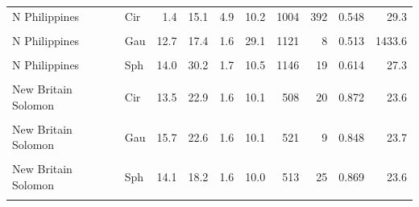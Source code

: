 \begin{ThreePartTable}
\begin{longtable}[t]{llrrrrrrrr}
N Philippines & Cir & 1.4 & 15.1 & 4.9 & 10.2 & 1004 & 392 & 0.548 & 29.3\\
\cellcolor{gray!6}{N Philippines} & \cellcolor{gray!6}{Exp} & \cellcolor{gray!6}{13.2} & \cellcolor{gray!6}{27.6} & \cellcolor{gray!6}{1.6} & \cellcolor{gray!6}{10.0} & \cellcolor{gray!6}{1265} & \cellcolor{gray!6}{11} & \cellcolor{gray!6}{0.615} & \cellcolor{gray!6}{27.3}\\
N Philippines & Gau & 12.7 & 17.4 & 1.6 & 29.1 & 1121 & 8 & 0.513 & 1433.6\\
\cellcolor{gray!6}{N Philippines} & \cellcolor{gray!6}{Lin} & \cellcolor{gray!6}{1.3} & \cellcolor{gray!6}{15.4} & \cellcolor{gray!6}{1.6} & \cellcolor{gray!6}{14.2} & \cellcolor{gray!6}{1206} & \cellcolor{gray!6}{66} & \cellcolor{gray!6}{0.541} & \cellcolor{gray!6}{28.6}\\
N Philippines & Sph & 14.0 & 30.2 & 1.7 & 10.5 & 1146 & 19 & 0.614 & 27.3\\
\cellcolor{gray!6}{New Britain Solomon} & \cellcolor{gray!6}{Bes} & \cellcolor{gray!6}{15.3} & \cellcolor{gray!6}{20.5} & \cellcolor{gray!6}{1.6} & \cellcolor{gray!6}{10.0} & \cellcolor{gray!6}{494} & \cellcolor{gray!6}{6} & \cellcolor{gray!6}{0.864} & \cellcolor{gray!6}{23.6}\\
New Britain Solomon & Cir & 13.5 & 22.9 & 1.6 & 10.1 & 508 & 20 & 0.872 & 23.6\\
\cellcolor{gray!6}{New Britain Solomon} & \cellcolor{gray!6}{Exp} & \cellcolor{gray!6}{13.3} & \cellcolor{gray!6}{16.9} & \cellcolor{gray!6}{1.7} & \cellcolor{gray!6}{10.4} & \cellcolor{gray!6}{573} & \cellcolor{gray!6}{17} & \cellcolor{gray!6}{0.852} & \cellcolor{gray!6}{23.5}\\
New Britain Solomon & Gau & 15.7 & 22.6 & 1.6 & 10.1 & 521 & 9 & 0.848 & 23.7\\
\cellcolor{gray!6}{New Britain Solomon} & \cellcolor{gray!6}{Lin} & \cellcolor{gray!6}{13.1} & \cellcolor{gray!6}{22.6} & \cellcolor{gray!6}{1.6} & \cellcolor{gray!6}{10.0} & \cellcolor{gray!6}{806} & \cellcolor{gray!6}{65} & \cellcolor{gray!6}{0.790} & \cellcolor{gray!6}{23.2}\\
New Britain Solomon & Sph & 14.1 & 18.2 & 1.6 & 10.0 & 513 & 25 & 0.869 & 23.6\\
\cellcolor{gray!6}{S Philippines} & \cellcolor{gray!6}{Bes} & \cellcolor{gray!6}{13.1} & \cellcolor{gray!6}{23.5} & \cellcolor{gray!6}{1.5} & \cellcolor{gray!6}{10.0} & \cellcolor{gray!6}{849} & \cellcolor{gray!6}{5} & \cellcolor{gray!6}{0.498} & \cellcolor{gray!6}{28.3}\\

\end{longtable}
\end{ThreePartTable}
